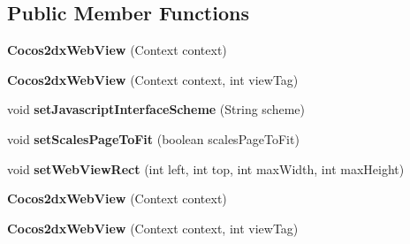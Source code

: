 \subsection*{Public Member Functions}
\begin{DoxyCompactItemize}
\item 
\mbox{\label{classorg_1_1cocos2dx_1_1lib_1_1Cocos2dxWebView_ad4616ed59b48b7a4d5e8c9238303a11d}} 
{\bfseries Cocos2dx\+Web\+View} (Context context)
\item 
\mbox{\label{classorg_1_1cocos2dx_1_1lib_1_1Cocos2dxWebView_a91b1874243cc648f6caaf90725f1efbb}} 
{\bfseries Cocos2dx\+Web\+View} (Context context, int view\+Tag)
\item 
\mbox{\label{classorg_1_1cocos2dx_1_1lib_1_1Cocos2dxWebView_a5b34ceda373e7039e567acb6f03f21eb}} 
void {\bfseries set\+Javascript\+Interface\+Scheme} (String scheme)
\item 
\mbox{\label{classorg_1_1cocos2dx_1_1lib_1_1Cocos2dxWebView_acd4488080324d243a15619f4ca99d225}} 
void {\bfseries set\+Scales\+Page\+To\+Fit} (boolean scales\+Page\+To\+Fit)
\item 
\mbox{\label{classorg_1_1cocos2dx_1_1lib_1_1Cocos2dxWebView_a395d5f7926bf28b5e34b440e00870c65}} 
void {\bfseries set\+Web\+View\+Rect} (int left, int top, int max\+Width, int max\+Height)
\item 
\mbox{\label{classorg_1_1cocos2dx_1_1lib_1_1Cocos2dxWebView_ad4616ed59b48b7a4d5e8c9238303a11d}} 
{\bfseries Cocos2dx\+Web\+View} (Context context)
\item 
\mbox{\label{classorg_1_1cocos2dx_1_1lib_1_1Cocos2dxWebView_a91b1874243cc648f6caaf90725f1efbb}} 
{\bfseries Cocos2dx\+Web\+View} (Context context, int view\+Tag)
\item 
\mbox{\label{classorg_1_1cocos2dx_1_1lib_1_1Cocos2dxWebView_a5b34ceda373e7039e567acb6f03f21eb}} 

\end{DoxyCompactItemize}
